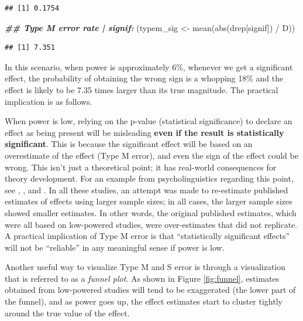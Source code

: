 \documentclass[
  12pt,
]{krantz}
\newenvironment{Shaded}{\begin{snugshade}}{\end{snugshade}}
\newcommand{\DocumentationTok}[1]{\textcolor[rgb]{0.56,0.35,0.01}{\textbf{\textit{#1}}}}
\newcommand{\FunctionTok}[1]{\textcolor[rgb]{0.00,0.00,0.00}{#1}}
\newcommand{\NormalTok}[1]{#1}
\newcommand{\OtherTok}[1]{\textcolor[rgb]{0.56,0.35,0.01}{#1}}
\newcommand{\SpecialCharTok}[1]{\textcolor[rgb]{0.00,0.00,0.00}{#1}}
\theoremstyle{definition}
\theoremstyle{definition}
\theoremstyle{definition}
\theoremstyle{definition}
\theoremstyle{remark}
\begin{document}
\begin{verbatim}
## [1] 0.1754
\end{verbatim}

\begin{Shaded}
\begin{Highlighting}[]
\DocumentationTok{\#\# Type M error rate | signif:}
\NormalTok{(typem\_sig }\OtherTok{\textless{}{-}} \FunctionTok{mean}\NormalTok{(}\FunctionTok{abs}\NormalTok{(drep[signif]) }\SpecialCharTok{/}\NormalTok{ D))}
\end{Highlighting}
\end{Shaded}

\begin{verbatim}
## [1] 7.351
\end{verbatim}

In this scenario, when power is approximately 6\%, whenever we get a significant effect, the probability of obtaining the wrong sign is a whopping 18\% and the effect is likely to be 7.35 times larger than its true magnitude. The practical implication is as follows.

When power is low, relying on the p-value (statistical significance) to declare an effect as being present will be misleading \textbf{even if the result is statistically significant}. This is because the significant effect will be based on an overestimate of the effect (Type M error), and even the sign of the effect could be wrong. This isn't just a theoretical point; it has real-world consequences for theory development. For an example from psycholinguistics regarding this point, see \citet{VasishthMertzenJaegerGelman2018}, \citet{JaegerMertzenVanDykeVasishth2019}, and \citet{MertzenEtAl2021}. In all these studies, an attempt was made to re-estimate published estimates of effects using larger sample sizes; in all cases, the larger sample sizes showed smaller estimates. In other words, the original published estimates, which were all based on low-powered studies, were over-estimates that did not replicate. A practical implication of Type M error is that ``statistically significant effects'' will not be ``reliable'' in any meaningful sense if power is low.

Another useful way to visualize Type M and S error is through a visualization that is referred to as a \emph{funnel plot}. As shown in Figure \ref{fig:funnel}, estimates obtained from low-powered studies will tend to be exaggerated (the lower part of the funnel), and as power goes up, the effect estimates start to cluster tightly around the true value of the effect.
\end{document}
